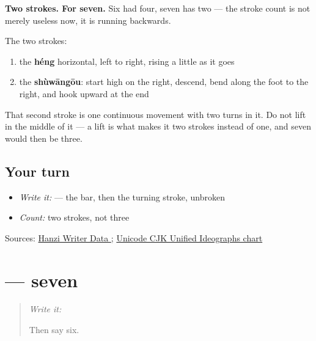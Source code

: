 \begin{quote}
\end{quote}

\textbf{Two strokes. For seven.} Six had four, seven has two — the stroke count is not merely useless now, it is running backwards.

The two strokes:

\begin{enumerate}
\raggedright
  \item the \textbf{héng} horizontal, left to right, rising a little as it goes
  \item the \textbf{shùwāngōu}: start high on the right, descend, bend along the foot to the right, and hook upward at the end
\end{enumerate}

That second stroke is one continuous movement with two turns in it. Do not lift in the middle of it — a lift is what makes it two strokes instead of one, and seven would then be three.

\subsection*{Your turn}
\begin{itemize}
\raggedright
  \item \emph{Write it:}  — the bar, then the turning stroke, unbroken
  \item \emph{Count:} two strokes, not three
\end{itemize}

\begin{tcolorbox}[breakable,colback=teal!4,colframe=teal!35!black,title={Before you move on}]
Sources: \href{https://raw.githubusercontent.com/chanind/hanzi-writer-data/68d10a4b21150cae5e1ebbd223eed289cf32d90c/data/\%E4\%B8\%83.json}{Hanzi Writer Data }; \href{https://www.unicode.org/charts/PDF/U4E00.pdf}{Unicode CJK Unified Ideographs chart}
\end{tcolorbox}
\section[\texorpdfstring{\zh{七} (qī)}{七 (qī)}]{ — seven}

\label{lesson:ZH-C20-qi}



\begin{quote}
\emph{Write it:} 

Then say six.
\end{quote}


